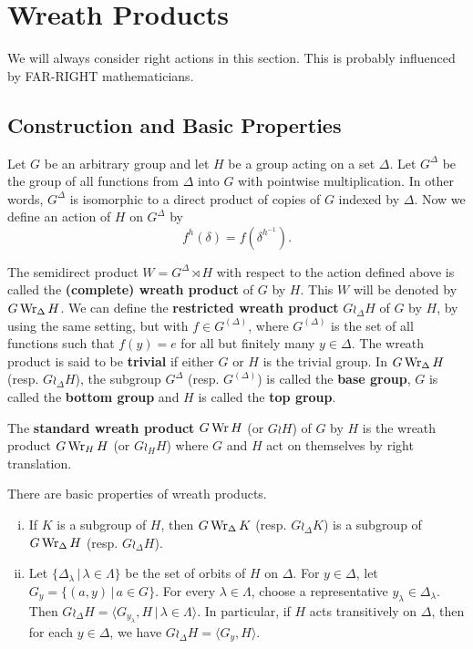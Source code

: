\section{Wreath Products}
We will always consider right actions in this section. This is probably influenced by FAR-RIGHT mathematicians.
\subsection{Construction and Basic Properties}
Let $G$ be an arbitrary group and let $H$ be a group acting on a set $\Delta$. Let $G^\Delta$ be the group of all functions from $\Delta$ into $G$ with pointwise multiplication. In other words,  $G^\Delta$ is isomorphic to a direct product of copies of $G$ indexed by $\Delta$. Now we define an action of $H$ on  $G^\Delta$ by 
\begin{equation*}
	f^h(\delta) = f(\delta^{h^{-1}}).
\end{equation*}
\begin{definition}
	The semidirect product $W = G^\Delta \rtimes H$ with respect to the action defined above  is called the \textbf{(complete) wreath product} of $G$ by $H$. This $W$ will be denoted by $G \operatorname{Wr}_{\Delta} H$. We can define the \textbf{restricted wreath product} $G \wr_{\Delta} H$ of $G$ by $H$, by using the same setting, but with $f\in G^{(\Delta)}$, where $G^{(\Delta)}$ is the set of all functions such that $f(y) = e$ for all but finitely many $y\in \Delta$. The wreath product is said to be \textbf{trivial} if either $G$ or $H$ is the trivial group. In $G\operatorname{Wr}_\Delta H$ (resp. $G\wr_\Delta H$), the subgroup $G^\Delta$ (resp. $G^{(\Delta)}$) is called the \textbf{base group}, $G$ is called the \textbf{bottom group} and $H$ is called the \textbf{top group}.
\end{definition}


\begin{definition}
	The \textbf{standard wreath product} $G\operatorname{Wr} H$ (or $G\wr H$) of $G$ by $H$ is the wreath product $G\operatorname{Wr}_H H$ (or $G\wr_H H$) where $G$ and $H$ act on themselves by right translation.
\end{definition}
\begin{proposition}
	There are basic properties of wreath products.
	\begin{enumerate}[(i)]
		\item If $K$ is a subgroup of $H$, then $G\operatorname{Wr}_\Delta K$ (resp. $G\wr_\Delta K$) is a subgroup of $G\operatorname{Wr}_\Delta H$ (resp. $G\wr_\Delta H$).
		\item Let $\{\Delta_{\lambda}\,|\,\lambda\in\Lambda\}$ be the set of orbits of $H$ on $\Delta$. For $y\in \Delta$, let $G_y = \{(a,y)\,|\, a\in G\}$. For every $\lambda\in \Lambda$, choose a representative $y_\lambda\in \Delta_\lambda$.  Then $G\wr_\Delta H = \langle G_{y_\lambda},H\,|\, \lambda\in \Lambda\rangle$. In particular, if $H$ acts transitively on $\Delta$, then for each $y\in \Delta$, we have $G\wr_\Delta H = \langle G_y ,H\rangle$.
	\end{enumerate}
\end{proposition}



